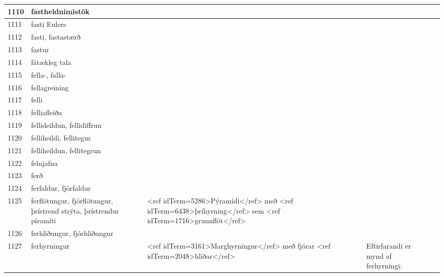 \begin{longtable}{p{}|p{}|p{}|p{}|p{}}
\hline
1110 & fastheldnimistök &  &  &  \\
\hline
1111 & fasti Eulers &  &  &  \\
\hline
1112 & fasti, fastastærð &  &  &  \\
\hline
1113 & fastur &  &  &  \\
\hline
1114 & fátækleg tala &  &  &  \\
\hline
1115 & fella-, falla- &  &  &  \\
\hline
1116 & fellagreining &  &  &  \\
\hline
1117 & felli &  &  &  \\
\hline
1118 & felliafleiða &  &  &  \\
\hline
1119 & fellideildun, fellidiffrun &  &  &  \\
\hline
1120 & felliheildi, fellitegur &  &  &  \\
\hline
1121 & felliheildun, fellitegrun &  &  &  \\
\hline
1122 & felujafna &  &  &  \\
\hline
1123 & ferð &  &  &  \\
\hline
1124 & ferfaldur, fjórfaldur &  &  &  \\
\hline
1125 & ferflötungur, fjórflötungur, þrístrend strýta, þrístrendur píramíti & <ref idTerm=5286>Pýramídi</ref> með <ref idTerm=6438>þríhyrning</ref> sem <ref idTerm=1716>grunnflöt</ref> &  &  \\
\hline
1126 & ferhliðungur, fjórhliðungur &  &  &  \\
\hline
1127 & ferhyrningur & <ref idTerm=3161>Marghyrningur</ref> með fjórar <ref idTerm=2048>hliðar</ref> & Eftirfarandi er mynd af ferhyrningi:


\end{longtable}
